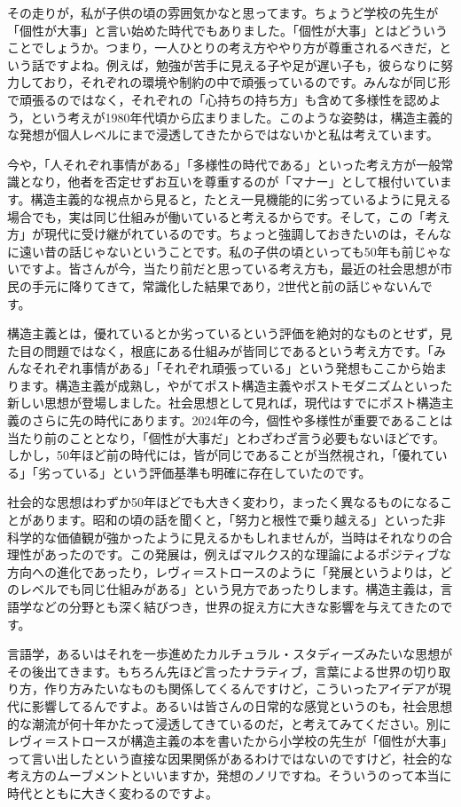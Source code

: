 \documentclass{ltjsbook}
\begin{document}
その走りが，私が子供の頃の雰囲気かなと思ってます。ちょうど学校の先生が「個性が大事」と言い始めた時代でもありました。「個性が大事」とはどういうことでしょうか。つまり，一人ひとりの考え方ややり方が尊重されるべきだ，という話ですよね。例えば，勉強が苦手に見える子や足が遅い子も，彼らなりに努力しており，それぞれの環境や制約の中で頑張っているのです。みんなが同じ形で頑張るのではなく，それぞれの「心持ちの持ち方」も含めて多様性を認めよう，という考えが1980年代頃から広まりました。このような姿勢は，構造主義的な発想が個人レベルにまで浸透してきたからではないかと私は考えています。

今や，「人それぞれ事情がある」「多様性の時代である」といった考え方が一般常識となり，他者を否定せずお互いを尊重するのが「マナー」として根付いています。構造主義的な視点から見ると，たとえ一見機能的に劣っているように見える場合でも，実は同じ仕組みが働いていると考えるからです。そして，この「考え方」が現代に受け継がれているのです。ちょっと強調しておきたいのは，そんなに遠い昔の話じゃないということです。私の子供の頃といっても50年も前じゃないですよ。皆さんが今，当たり前だと思っている考え方も，最近の社会思想が市民の手元に降りてきて，常識化した結果であり，2世代と前の話じゃないんです。

構造主義とは，優れているとか劣っているという評価を絶対的なものとせず，見た目の問題ではなく，根底にある仕組みが皆同じであるという考え方です。「みんなそれぞれ事情がある」「それぞれ頑張っている」という発想もここから始まります。構造主義が成熟し，やがてポスト構造主義やポストモダニズムといった新しい思想が登場しました。社会思想として見れば，現代はすでにポスト構造主義のさらに先の時代にあります。2024年の今，個性や多様性が重要であることは当たり前のこととなり，「個性が大事だ」とわざわざ言う必要もないほどです。しかし，50年ほど前の時代には，皆が同じであることが当然視され，「優れている」「劣っている」という評価基準も明確に存在していたのです。

社会的な思想はわずか50年ほどでも大きく変わり，まったく異なるものになることがあります。昭和の頃の話を聞くと，「努力と根性で乗り越える」といった非科学的な価値観が強かったように見えるかもしれませんが，当時はそれなりの合理性があったのです。この発展は，例えばマルクス的な理論によるポジティブな方向への進化であったり，レヴィ＝ストロースのように「発展というよりは，どのレベルでも同じ仕組みがある」という見方であったりします。構造主義は，言語学などの分野とも深く結びつき，世界の捉え方に大きな影響を与えてきたのです。

言語学，あるいはそれを一歩進めたカルチュラル・スタディーズみたいな思想がその後出てきます。もちろん先ほど言ったナラティブ，言葉による世界の切り取り方，作り方みたいなものも関係してくるんですけど，こういったアイデアが現代に影響してるんですよ。あるいは皆さんの日常的な感覚というのも，社会思想的な潮流が何十年かたって浸透してきているのだ，と考えてみてください。別にレヴィ＝ストロースが構造主義の本を書いたから小学校の先生が「個性が大事」って言い出したという直接な因果関係があるわけではないのですけど，社会的な考え方のムーブメントといいますか，発想のノリですね。そういうのって本当に時代とともに大きく変わるのですよ。
\end{document}
